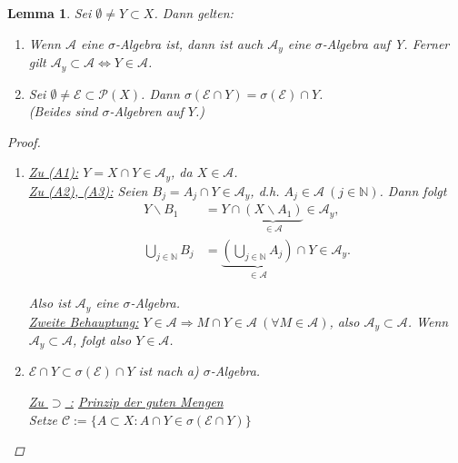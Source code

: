 \documentclass[a4paper]{report}
\newcommand{\PowerSet}{\mathcal{P}}
\newcommand{\N}{\mathbb{N}}
\newcommand{\jlabel}[1]{\label{j_#1}}
\newcommand{\jspacesmall}{\vspace{4pt}}
\theoremstyle{plain}
\newtheorem{lem}[thm]{Lemma}
\theoremstyle{definition}
\begin{document}
{{\begin{lem}
\jlabel{Lem 1.10}
    Sei $\emptyset \ne Y \subset X$. Dann gelten:
    \begin{enumerate}
        \item Wenn $\mathcal{A}$ eine $\sigma$-Algebra ist, dann ist auch $\mathcal{A}_y$ eine $\sigma$-Algebra auf Y. Ferner gilt $\mathcal{A}_y \subset \mathcal{A} \Leftrightarrow Y \in \mathcal{A}$.
        \item Sei $\emptyset \ne \mathcal{E} \subset \PowerSet(X)$. Dann $\sigma(\mathcal{E} \cap Y) = \sigma(\mathcal{E}) \cap Y$. \\
            (Beides sind $\sigma$-Algebren auf $Y$.)
    \end{enumerate}
    \begin{proof}
        \begin{enumerate}
            \item 
                \uline{Zu (A1):} $Y = X \cap Y \in \mathcal{A}_y$, da $X \in \mathcal{A}$.\\
                \uline{Zu (A2), (A3):} Seien $B_j = A_j \cap Y \in \mathcal{A}_y$, d.h. $A_j \in \mathcal{A} \ (j \in \N)$. Dann folgt
                \begin{displaymath}
                    \begin{split}
                        Y \backslash B_1 &= Y \cap \underbrace{(X \backslash A_1)}_{\in \mathcal{A}} \in \mathcal{A}_y,\\
                        \bigcup_{j\in \N} B_j &= \underbrace{( \bigcup_{j \in \N} A_j )}_{\in \mathcal{A}} \cap Y \in \mathcal{A}_y.
                    \end{split}
                \end{displaymath}

                Also ist $\mathcal{A}_y$ eine $\sigma$-Algebra.\\
                \uline{Zweite Behauptung:} $Y\in \mathcal{A} \Rightarrow M \cap Y \in \mathcal{A} \ (\forall M \in \mathcal{A})$, also $\mathcal{A}_y \subset \mathcal{A}$. Wenn $\mathcal{A}_y \subset \mathcal{A}$, folgt also $Y \in \mathcal{A}$.
                
            \item
                $\mathcal{E} \cap Y \subset \sigma(\mathcal{E}) \cap Y$ ist nach a) $\sigma$-Algebra.
                
                \jspacesmall
                
                \uline{Zu $\supset$ :} \uline{Prinzip der guten Mengen}\\
                Setze $\mathcal{C} := \{A \subset X : A \cap Y \in \sigma(\mathcal{E} \cap Y)\}$
                

\end{enumerate}
\end{proof}
\end{lem}}}
\end{document}
